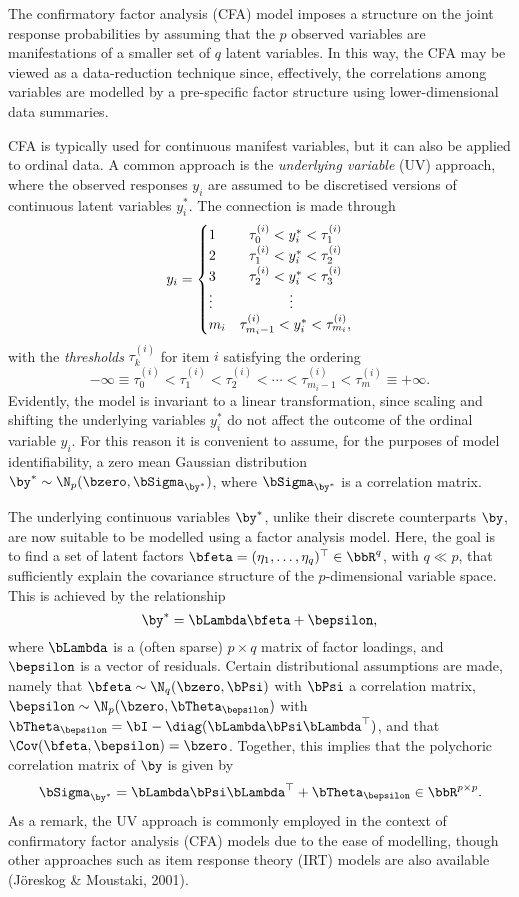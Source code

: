 \documentclass[
  letterpaper,
  DIV=11,
  numbers=noendperiod]{scrartcl}
\begin{document}
The confirmatory factor analysis (CFA) model imposes a structure on the
joint response probabilities by assuming that the \(p\) observed
variables are manifestations of a smaller set of \(q\) latent variables.
In this way, the CFA may be viewed as a data-reduction technique since,
effectively, the correlations among variables are modelled by a
pre-specific factor structure using lower-dimensional data summaries.

CFA is typically used for continuous manifest variables, but it can also
be applied to ordinal data. A common approach is the \emph{underlying
variable} (UV) approach, where the observed responses \(y_i\) are
assumed to be discretised versions of continuous latent variables
\(y_i^*\). The connection is made through \[
y_i = \begin{cases}
1 & \ \ \tau_0^{(i)} < y^*_i < \tau_1^{(i)} \\
2 &  \ \ \tau_{1}^{(i)} <  y^*_i < \tau_2^{(i)} \\
3 &  \ \ \tau_{2}^{(i)} <  y^*_i < \tau_3^{(i)} \\
\vdots &  \hphantom{\tau_{1}^{(i)} \leq \ \ \ } \vdots \\
m_i & \tau_{m_i-1}^{(i)} < y^*_i < \tau_{m_i}^{(i)},
\end{cases}
\] with the \emph{thresholds} \(\tau_k^{(i)}\) for item \(i\) satisfying
the ordering \[
-\infty \equiv \tau_0^{(i)} < \tau_1^{(i)} < \tau_2^{(i)} < \cdots < \tau_{m_i-1}^{(i)} < \tau_m^{(i)} \equiv +\infty.
\] Evidently, the model is invariant to a linear transformation, since
scaling and shifting the underlying variables \(y_i^*\) do not affect
the outcome of the ordinal variable \(y_i\). For this reason it is
convenient to assume, for the purposes of model identifiability, a zero
mean Gaussian distribution \(\by^* \sim \N_p(\bzero,\bSigma_{\by^*})\),
where \(\bSigma_{\by^*}\) is a correlation matrix.

The underlying continuous variables \(\by^*\), unlike their discrete
counterparts \(\by\), are now suitable to be modelled using a factor
analysis model. Here, the goal is to find a set of latent factors
\(\bfeta = (\eta_1,\dots,\eta_q)^\top \in \bbR^q\), with \(q \ll p\),
that sufficiently explain the covariance structure of the
\(p\)-dimensional variable space. This is achieved by the relationship
\[
\by^* = \bLambda \bfeta + \bepsilon,
\] where \(\bLambda\) is a (often sparse) \(p \times q\) matrix of
factor loadings, and \(\bepsilon\) is a vector of residuals. Certain
distributional assumptions are made, namely that
\(\bfeta \sim \N_q(\bzero,\bPsi)\) with \(\bPsi\) a correlation matrix,
\(\bepsilon \sim \N_p(\bzero,\bTheta_{\bepsilon})\) with
\(\bTheta_{\bepsilon} = \bI - \diag(\bLambda \bPsi \bLambda^\top)\), and
that \(\Cov(\bfeta,\bepsilon) = \bzero\). Together, this implies that
the polychoric correlation matrix of \(\by\) is given by \[
\bSigma_{\by^*} = \bLambda \bPsi \bLambda^\top + \bTheta_{\bepsilon} \in \bbR^{p\times p}.
\] As a remark, the UV approach is commonly employed in the context of
confirmatory factor analysis (CFA) models due to the ease of modelling,
though other approaches such as item response theory (IRT) models are
also available (Jöreskog \& Moustaki, 2001).
\end{document}
